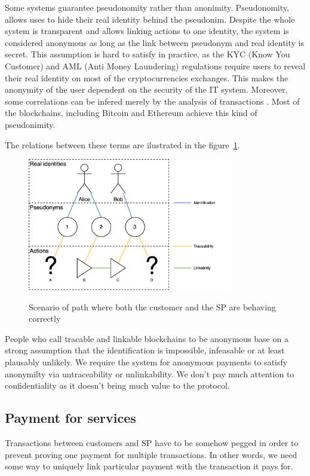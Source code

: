 \documentclass{ieeeaccess}
\begin{document}
Some systems guarantee pseudonomity rather than anonimity. Pseudonomity,
allows uses to hide their real identity behind the pseudonim. Despite
the whole system is transparent and allows linking actions to one
identity, the system is considered anonymous as long as the link between
pseudonym and real identity is secret. This assumption is hard to
satisfy in practice, as the KYC (Know You Customer) and AML (Anti Money
Laundering) regulations require users to reveal their real identity on
most of the cryptocurrencies exchanges. This makes the anonymity of the
user dependent on the security of the IT system. Moreover, some
correlations can be infered merely by the analysis of transactions
\cite{androulaki2013evaluating, ober2013structure}. Most of the
blockchains, including Bitcoin and Ethereum achieve this kind of
pseudonimity.

The relations between these terms are ilustrated in the figure~\ref{fig:anonimity-confidentality}.

\begin{figure}[h!]
\caption{Scenario of path where both the customer and  the SP are behaving correctly}
\centering
\includegraphics[width=9cm]{anonimity-confidentality.png}
\label{fig:anonimity-confidentality}
\end{figure}



People who call tracable and linkable blockchains to be anonymous base
on a strong assumption that the identification is impossible, infeasable
or at least plausably unlikely. We require the system for anonymous
payments to satisfy anonymilty via untraceability or unlinkability. We
don't pay much attention to confidentiality as it doesn't bring much
value to the protocol.


\subsection{Payment for services}
Transactions between customers and SP have to be somehow pegged in order
to prevent proving one payment for multiple transactions. In other
words, we need some way to uniquely link particular payment with the
transaction it pays for.
\end{document}
